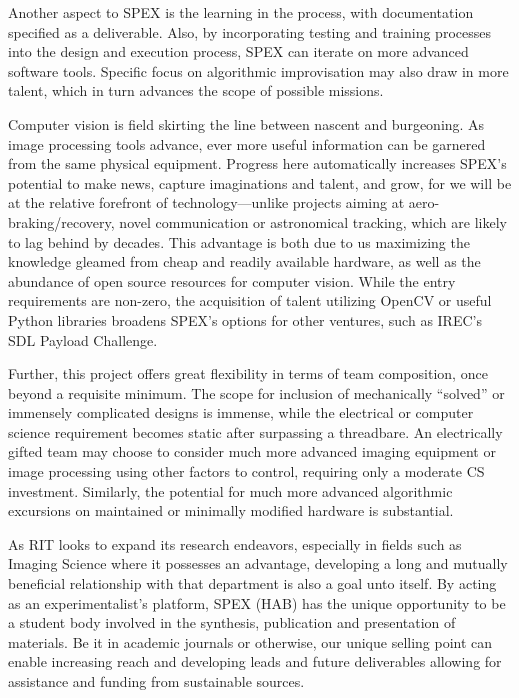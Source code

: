 \documentclass[conference]{IEEEtran} %
\begin{document}
Another aspect to SPEX is the learning in the process, with documentation specified as a deliverable. 
Also, by incorporating testing and training processes into the design and execution process, SPEX can iterate on more advanced software tools. 
Specific focus on algorithmic improvisation may also draw in more talent, which in turn advances the scope of possible missions.

Computer vision is field skirting the line between nascent and burgeoning. 
As image processing tools advance, ever more useful information can be garnered from the same physical equipment. 
Progress here automatically increases SPEX's potential to make news, capture imaginations and talent, and grow, for we will be at the relative forefront of technology---unlike projects aiming at aero-braking/recovery, novel communication or astronomical tracking, which are likely to lag behind by decades. 
This advantage is both due to us maximizing the knowledge gleamed from cheap and readily available hardware, as well as the abundance of open source resources for computer vision. 
While the entry requirements are non-zero, the acquisition of talent utilizing OpenCV or useful Python libraries broadens SPEX's options for other ventures, such as IREC's SDL Payload Challenge. 

Further, this project offers great flexibility in terms of team composition, once beyond a requisite minimum.
The scope for inclusion of mechanically ``solved'' or immensely complicated designs is immense, while the electrical or computer science requirement becomes static after surpassing a threadbare. 
An electrically gifted team may choose to consider much more advanced imaging equipment or image processing using other factors to control, requiring only a moderate CS investment. 
Similarly, the potential for much more advanced algorithmic excursions on maintained or minimally modified hardware is substantial. 

As RIT looks to expand its research endeavors, especially in fields such as Imaging Science where it possesses an advantage, developing a long and mutually beneficial relationship with that department is also a goal unto itself. 
By acting as an experimentalist's platform, SPEX (HAB) has the unique opportunity to be a student body involved in the synthesis, publication and presentation of materials. 
Be it in academic journals or otherwise, our unique selling point can enable increasing reach and developing leads and future deliverables allowing for assistance and funding from sustainable sources.
\end{document}
